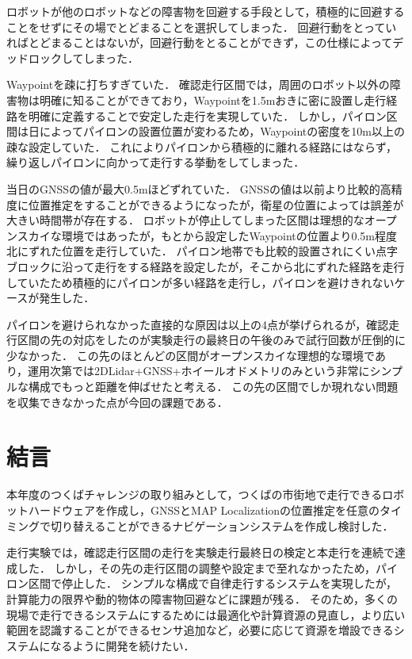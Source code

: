\documentclass[platex,dvipdfmx]{rbproceedings}
\begin{document}
ロボットが他のロボットなどの障害物を回避する手段として，積極的に回避することをせずにその場でとどまることを選択してしまった．
回避行動をとっていればとどまることはないが，回避行動をとることができず，この仕様によってデッドロックしてしまった．

Waypointを疎に打ちすぎていた．
確認走行区間では，周囲のロボット以外の障害物は明確に知ることができており，Waypointを1.5mおきに密に設置し走行経路を明確に定義することで安定した走行を実現していた．
しかし，パイロン区間は日によってパイロンの設置位置が変わるため，Waypointの密度を10m以上の疎な設定していた．
これによりパイロンから積極的に離れる経路にはならず，繰り返しパイロンに向かって走行する挙動をしてしまった．

当日のGNSSの値が最大0.5mほどずれていた．
GNSSの値は以前より比較的高精度に位置推定をすることができるようになったが，衛星の位置によっては誤差が大きい時間帯が存在する．
ロボットが停止してしまった区間は理想的なオープンスカイな環境ではあったが，もとから設定したWaypointの位置より0.5m程度北にずれた位置を走行していた．
パイロン地帯でも比較的設置されにくい点字ブロックに沿って走行をする経路を設定したが，そこから北にずれた経路を走行していたため積極的にパイロンが多い経路を走行し，パイロンを避けきれないケースが発生した．

パイロンを避けられなかった直接的な原因は以上の4点が挙げられるが，確認走行区間の先の対応をしたのが実験走行の最終日の午後のみで試行回数が圧倒的に少なかった．
この先のほとんどの区間がオープンスカイな理想的な環境であり，運用次第では2DLidar+GNSS+ホイールオドメトリのみという非常にシンプルな構成でもっと距離を伸ばせたと考える．
この先の区間でしか現れない問題を収集できなかった点が今回の課題である．

\section{結言}
本年度のつくばチャレンジの取り組みとして，つくばの市街地で走行できるロボットハードウェアを作成し，GNSSとMAP Localizationの位置推定を任意のタイミングで切り替えることができるナビゲーションシステムを作成し検討した．

走行実験では，確認走行区間の走行を実験走行最終日の検定と本走行を連続で達成した．
しかし，その先の走行区間の調整や設定まで至れなかったため，パイロン区間で停止した．
シンプルな構成で自律走行するシステムを実現したが，計算能力の限界や動的物体の障害物回避などに課題が残る．
そのため，多くの現場で走行できるシステムにするためには最適化や計算資源の見直し，より広い範囲を認識することができるセンサ追加など，必要に応じて資源を増設できるシステムになるように開発を続けたい．
\end{document}
